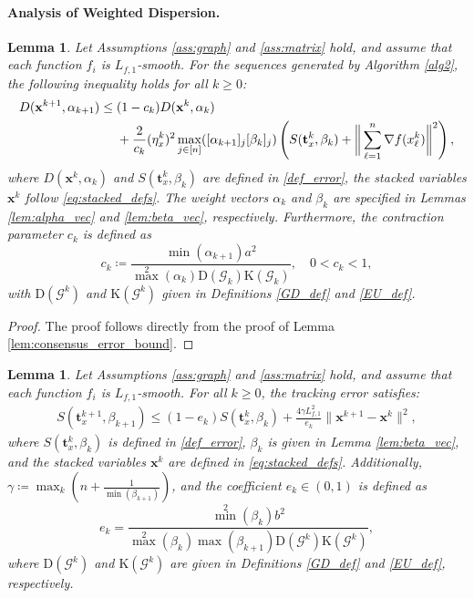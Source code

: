 \documentclass{article}
\theoremstyle{plain}
\newtheorem{lemma}[theorem]{Lemma}
\theoremstyle{definition}
\theoremstyle{remark}
\begin{document}
\paragraph{Analysis of Weighted Dispersion.}
\begin{lemma}\label{lem:consensus_contraction_single}
    Let Assumptions \ref{ass:graph} and \ref{ass:matrix} hold, and assume that each function $f_{i}$ is $L_{f,1}$-smooth. For the sequences generated by Algorithm \ref{alg2}, the following inequality holds for all $k \ge 0$:
    \begin{align}
        D(\mathbf{x}^{k+1}, \alpha_{k+1}) \leq{}& (1-c_{k} )D(\mathbf{x}^{k}, \alpha_{k}) \notag \\
        &+ \frac{2}{c_{k}}(\eta_{x}^{k})^{2}  \max_{j\in[n]}([\alpha_{k+1}]_{j}[\beta_{k}]_{j}) \left( S(\mathbf{t}_{x}^{k}, \beta_{k}) + \bigg\| \sum_{\ell=1}^n \nabla f(x_\ell^k) \bigg\|^{2} \right),
    \end{align}
  where $D(\mathbf{x}^{k}, \alpha_{k})$ and $S(\mathbf{t}_{x}^{k}, \beta_{k})$ are defined in \eqref{def_error}, the stacked variables $\mathbf{x}^k$ follow \eqref{eq:stacked_defs}. The weight vectors $\alpha_{k}$ and $\beta_{k}$ are specified in Lemmas \ref{lem:alpha_vec} and \ref{lem:beta_vec}, respectively. Furthermore, the contraction parameter $c_{k}$ is defined as
    \begin{equation*}
      c_{k} \coloneqq \frac{\min(\alpha_{k+1})a^{2}}{\max^{2}(\alpha_{k})\mathrm{D}(\mathcal{G}_{k})\mathrm{K}(\mathcal{G}_{k})} ,\quad 0<c_{k}<1,
    \end{equation*}
    with $\mathrm{D}(\mathcal{G}^{k})$ and $\mathrm{K}(\mathcal{G}^{k})$ given in Definitions \ref{GD_def} and \ref{EU_def}.
\end{lemma}
\begin{proof}
    The proof follows directly from the proof of  Lemma \ref{lem:consensus_error_bound}.
\end{proof}
\begin{lemma}\label{lem:tracking_error_bound_single}
    Let Assumptions \ref{ass:graph} and \ref{ass:matrix} hold, and assume that each function $f_{i}$ is $L_{f,1}$-smooth. For all $k \geq 0$, the tracking error satisfies:
    \begin{align}
        S(\mathbf{t}_{x}^{k+1},\beta_{k+1}) \leq (1-e_k)S(\mathbf{t}_{x}^{k},\beta_{k}) + \frac{4\gamma L_{f,1}^{2}}{e_k} \|\mathbf{x}^{k+1}-\mathbf{x}^{k}\|^{2},
    \end{align}
 where $S(\mathbf{t}_{x}^{k},\beta_{k})$ is defined in \eqref{def_error}, $\beta_{k}$ is given in Lemma \ref{lem:beta_vec}, and  the stacked variables $\mathbf{x}^{k}$ are defined in \eqref{eq:stacked_defs}. Additionally, $\gamma \coloneqq \max_{k}(n+\frac{1}{\min(\beta_{k+1})})$, and the coefficient $e_{k} \in (0,1)$ is defined as
    \[
        e_{k} = \frac{\min^{2}(\beta_{k}) b^{2}}{\max^{2}(\beta_{k})\max(\beta_{k+1}) \mathrm{D}(\mathcal{G}^{k})\mathrm{K}(\mathcal{G}^{k})},
    \]
    where $\mathrm{D}(\mathcal{G}^{k})$ and $\mathrm{K}(\mathcal{G}^{k})$ are given in Definitions \ref{GD_def} and \ref{EU_def}, respectively.
\end{lemma}
\end{document}
